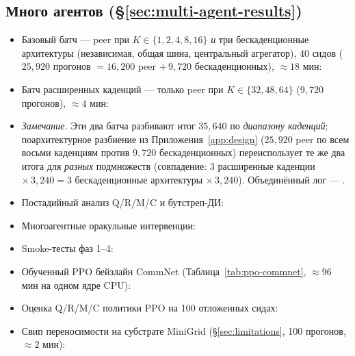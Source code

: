 \documentclass{article}
\begin{document}
\subsection*{Много агентов (\S\ref{sec:multi-agent-results})}
\begin{itemize}[leftmargin=16pt]
\item Базовый батч --- peer при $K\in\{1,2,4,8,16\}$ \emph{и} три бескаденционные архитектуры (независимая, общая шина, центральный агрегатор), 40 сидов ($25{,}920$ прогонов $=16{,}200$ peer $+\,9{,}720$ бескаденционных), $\approx 18$ мин:
\item Батч расширенных каденций --- только peer при $K\in\{32,48,64\}$ ($9{,}720$ прогонов), $\approx 4$ мин:
\item[] \emph{Замечание.} Эти два батча разбивают итог $35{,}640$ по \emph{диапазону каденций}; поархитектурное разбиение из Приложения~\ref{app:design} ($25{,}920$ peer по всем восьми каденциям против $9{,}720$ бескаденционных) переиспользует те же два итога для \emph{разных} подмножеств (совпадение: $3$ расширенные каденции $\times\,3{,}240 = 3$ бескаденционные архитектуры $\times\,3{,}240$). Объединённый лог --- .
\item Постадийный анализ Q/R/M/C и бутстреп-ДИ:
\item Многоагентные оракульные интервенции:
\item Smoke-тесты фаз 1--4:
\item Обученный PPO бейзлайн CommNet (Таблица~\ref{tab:ppo-commnet}, $\approx 96$ мин на одном ядре CPU):
\item Оценка Q/R/M/C политики PPO на 100 отложенных сидах:
\item Свип переносимости на субстрате MiniGrid (\S\ref{sec:limitations}, 100 прогонов, $\approx 2$ мин):
\end{itemize}
\end{document}
